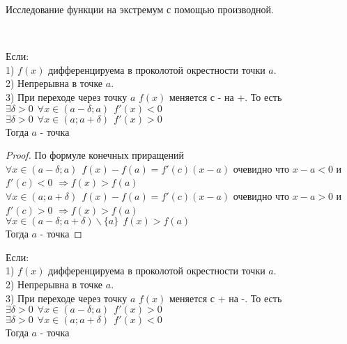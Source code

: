 \begin{title}
  Исследование функции на экстремум с помощью производной.
\end{title}

\\
\begin{theorem}
  Если: \\
    1) $f(x)$ дифференцируема в проколотой окрестности точки $a$.\\
    2) Непрерывна в точке $a$.\\
    3) При переходе через точку $a$ $f(x)$ меняется с - на +. То есть\\
      $\exists \delta > 0 ~~ \forall x \in (a - \delta; a) ~~ f'(x) < 0$\\
      $\exists \delta > 0 ~~ \forall x \in (a; a + \delta) ~~ f'(x) > 0$\\
  Тогда $a$ - точка 
\end{theorem}

\begin{proof}
  По формуле конечных приращений\\
  $\forall x \in (a - \delta; a) ~~ f(x) - f(a) = f'(c)(x - a)$ очевидно что
  $x - a < 0$ и \\ $f'(c) < 0$ $\Rightarrow f(x) > f(a)$\\
  $\forall x \in (a; a + \delta) ~~ f(x) - f(a) = f'(c)(x - a)$ очевидно что
  $x - a > 0$ и \\ $f'(c) > 0$ $\Rightarrow f(x) > f(a)$\\
  $\forall x \in (a - \delta; a+ \delta)\backslash \{a\} ~~ f(x) > f(a)$\\
  Тогда $a$ - точка 
\end{proof}

\begin{theorem}
  Если: \\
    1) $f(x)$ дифференцируема в проколотой окрестности точки $a$.\\
    2) Непрерывна в точке $a$.\\
    3) При переходе через точку $a$ $f(x)$ меняется с + на -. То есть\\
      $\exists \delta > 0 ~~ \forall x \in (a - \delta; a) ~~ f'(x) > 0$\\
      $\exists \delta > 0 ~~ \forall x \in (a; a + \delta) ~~ f'(x) < 0$\\
  Тогда $a$ - точка 
\end{theorem}

